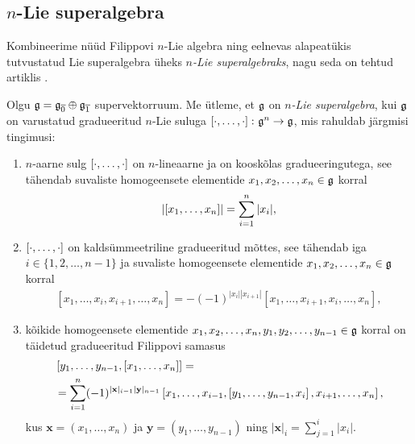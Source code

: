 \subsection{\texorpdfstring{$n$}\ -Lie superalgebra}

Kombineerime nüüd Filippovi $n$-Lie algebra ning eelnevas alapeatükis
tutvustatud Lie superalgebra üheks \emph{$n$-Lie superalgebraks}, nagu
seda on tehtud artiklis \cite{Abramov:2014}.

\begin{dfn}\label{def:n-Lie-superalgebra}
    Olgu $\mathfrak{g} = \mathfrak{g}_{\overline{0}} \oplus \mathfrak{g}_{\overline{1}}$
    supervektorruum. Me ütleme, et $\mathfrak{g}$ on
    \emph{$n$-Lie superalgebra}, kui $\mathfrak{g}$ on varustatud
    gradueeritud $n$-Lie suluga $\left[ \cdot, \dots, \cdot \right] \colon \mathfrak{g}^n \to \mathfrak{g}$,
    mis rahuldab järgmisi tingimusi:
    \begin{enumerate}
        \item $n$-aarne sulg $\left[ \cdot, \dots, \cdot \right]$ on $n$-lineaarne ja on
            kooskõlas gradueeringutega, see tähendab suvaliste
            homogeensete elementide $x_1, x_2, \dots, x_n \in \mathfrak{g}$ korral
            \begin{align}\label{def:n-lie-superalg-brac-grading}
                \left| \left[ x_1, \dots, x_n \right] \right| = \sum_{i=1}^n |x_i|,
            \end{align}
        \item $\left[ \cdot, \dots, \cdot \right]$ on kaldsümmeetriline gradueeritud mõttes,
            see tähendab iga $i \in \{1, 2, \dots, n-1\}$ ja suvaliste
            homogeensete elementide $x_1, x_2, \dots, x_n \in \mathfrak{g}$ korral
            \begin{align}
                \left[ x_1, \dots, x_i, x_{i+1}, \dots, x_n \right] =
                -(-1)^{|x_i| |x_{i+1}|} \left[
                    x_1, \dots, x_{i+1}, x_i, \dots, x_n
                \right],
            \end{align}
        \item kõikide homogeensete elementide
            $x_1, x_2, \dots, x_n, y_1, y_2, \dots, y_{n-1} \in \mathfrak{g}$ korral
            on täidetud gradueeritud Filippovi samasus
            \begin{align}\begin{split}
                &\left[ y_1, \dots, y_{n-1}, \left[ x_1, \dots, x_n \right] \right] = \\
                &= \sum_{i=1}^n (-1)^{|\mathbf{x}|_{i-1} |\mathbf{y}|_{n-1}}
                \left[
                    x_1, \dots, x_{i-1},
                    \left[ y_1, \dots, y_{n-1}, x_i \right],
                    x_{i+1}, \dots, x_n
                \right],
            \end{split}\end{align}
            kus $\mathbf{x} = (x_1, \dots, x_n)$ ja
            $\mathbf{y} = (y_1, \dots, y_{n-1})$ ning
            $|\mathbf{x}|_i = \sum_{j=1}^{i} |x_i|$.
    \end{enumerate}
\end{dfn}

